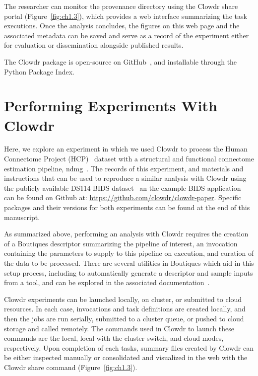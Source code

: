 \documentclass[fleqn,12pt]{SelfArx_ch} %
\begin{document}
The researcher can monitor the provenance directory using the Clowdr share portal (Figure~\ref{fig:ch1.3}), which
provides a web interface summarizing the task executions. Once the analysis concludes, the figures on this web page and
the associated metadata can be saved and serve as a record of the experiment either for evaluation or dissemination
alongside published results.

The Clowdr package is open-source on GitHub~\cite{Kiar2018-lq}, and installable through the Python Package Index.

\section{Performing Experiments With Clowdr}

Here, we explore an experiment in which we used Clowdr to process the Human Connectome Project
(HCP)~\cite{Van_Essen2013-bx} dataset with a structural and functional connectome estimation pipeline,
ndmg~\cite{Kiar2018-lz}. The records of this experiment, and materials and instructions that can be used to reproduce a
similar analysis with Clowdr using the publicly available DS114 BIDS dataset~\cite{Poldrack2013-wi} an the example BIDS
application~\cite{Gorgolewski2017-sr} can be found on Github at: \url{https://github.com/clowdr/clowdr-paper}. Specific
packages and their versions for both experiments can be found at the end of this manuscript.

As summarized above, performing an analysis with Clowdr requires the creation of a Boutiques descriptor summarizing the
pipeline of interest, an invocation containing the parameters to supply to this pipeline on execution, and curation of
the data to be processed. There are several utilities in Boutiques which aid in this setup process, including to
automatically generate a descriptor and sample inputs from a tool, and can be explored in the associated
documentation~\cite{Glatard2018-uw}.

Clowdr experiments can be launched locally, on cluster, or submitted to cloud resources. In each case, invocations and
task definitions are created locally, and then the jobs are run serially, submitted to a cluster queue, or pushed to
cloud storage and called remotely. The commands used in Clowdr to launch these commands are the local, local with the
cluster switch, and cloud modes, respectively. Upon completion of each tasks, summary files created by Clowdr can be
either inspected manually or consolidated and visualized in the web with the Clowdr share command
(Figure~\ref{fig:ch1.3}).
\end{document}
